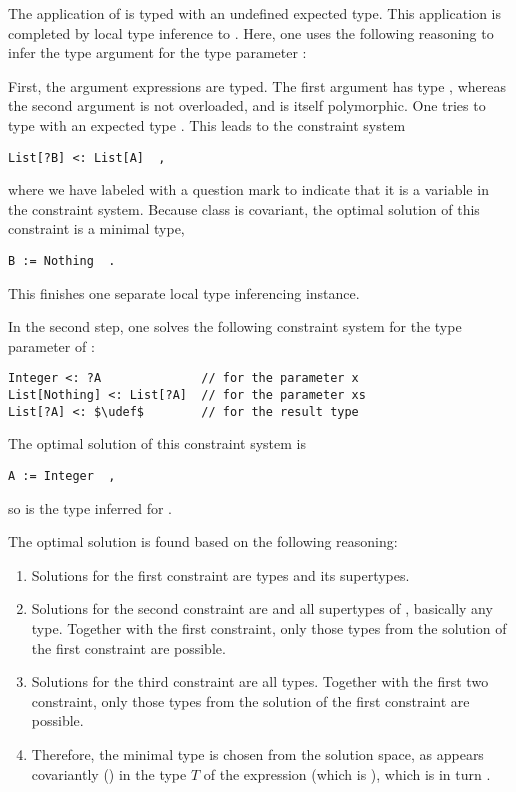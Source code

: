 The application of  is typed with an undefined expected type. This application is completed by local type inference to . Here, one uses the following reasoning to infer the type argument  for the type parameter :

First, the argument expressions are typed. The first argument  has type , whereas the second argument  is not overloaded, and is itself polymorphic. One tries to type  with an expected type . This leads to the constraint system
\begin{lstlisting}
List[?B] <: List[A]  ,
\end{lstlisting}
where we have labeled  with a question mark to indicate that it is a variable in the constraint system. Because class  is covariant, the optimal solution of this constraint is a minimal type, 
\begin{lstlisting}
B := Nothing  .
\end{lstlisting}

This finishes one separate local type inferencing instance. 

In the second step, one solves the following constraint system for the type parameter  of :
\begin{lstlisting}
Integer <: ?A              // for the parameter x
List[Nothing] <: List[?A]  // for the parameter xs
List[?A] <: $\udef$        // for the result type
\end{lstlisting}

The optimal solution of this constraint system is 
\begin{lstlisting}
A := Integer  ,
\end{lstlisting}
so  is the type inferred for . 

The optimal solution is found based on the following reasoning: 
\begin{enumerate}
  \item Solutions for the first constraint are types  and its supertypes.
  \item Solutions for the second constraint are  and all supertypes of , basically any type. Together with the first constraint, only those types from the solution of the first constraint are possible. 
  \item Solutions for the third constraint are all types. Together with the first two constraint, only those types from the solution of the first constraint are possible. 
  \item Therefore, the minimal type is chosen from the solution space, as  appears covariantly () in the type $T$ of the expression (which is ), which is in turn . 
\end{enumerate}

